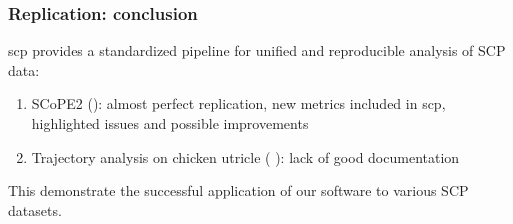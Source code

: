 \documentclass{beamer}
\newcommand{\hcode}[2][lgray]{{\ttfamily\color{vdgray}\colorbox{#1}{#2}}}
\begin{document}
\begin{frame}
  \frametitle{Replication: conclusion}
  
  \hcode{scp} provides a standardized pipeline for unified and 
  reproducible analysis of SCP data:
  
  \vfill
  \begin{enumerate}
    \item SCoPE2 ({\footnotesize \cite{Specht2020-jm}}): almost 
      perfect replication, new metrics included in \hcode{scp}, 
      highlighted issues and possible improvements 
    \item Trajectory analysis on chicken utricle ({\footnotesize 
      \cite{Zhu2019-ja}}): lack of good documentation
  \end{enumerate}
  
  \vfill
  This demonstrate the successful application of our software to 
  various SCP datasets. 
  
\end{frame}
\end{document}
